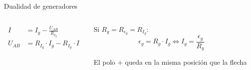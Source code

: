 \documentclass[aspectratio=169, xcolor={usenames,svgnames,dvipsnames}]{beamer}
\begin{document}
\begin{frame}{Dualidad de generadores}
\begin{columns}
\begin{column}{0.3\columnwidth}
\begin{center}
\begin{align*}
		I &= I_g - \frac{U_{AB}}{R_{I_g}} \\
		U_{AB} &= R_{I_g} \cdot I_g - R_{I_g} \cdot I
	\end{align*} 
\end{center}
\end{column}
\begin{column}{0.4\columnwidth}
\begin{center}
    Si $R_g = R_{\epsilon_g} = R_{I_g}$:
	\begin{equation*}
		\boxed{\epsilon_g = R_{g} \cdot I_g \Leftrightarrow {I_g = \frac{\epsilon_g}{R_g}}}  
	\end{equation*}
	
	\alert{El polo $+$ queda en la misma posición que la flecha}
\end{center}
\end{column}
\end{columns}
\end{frame}
\end{document}
